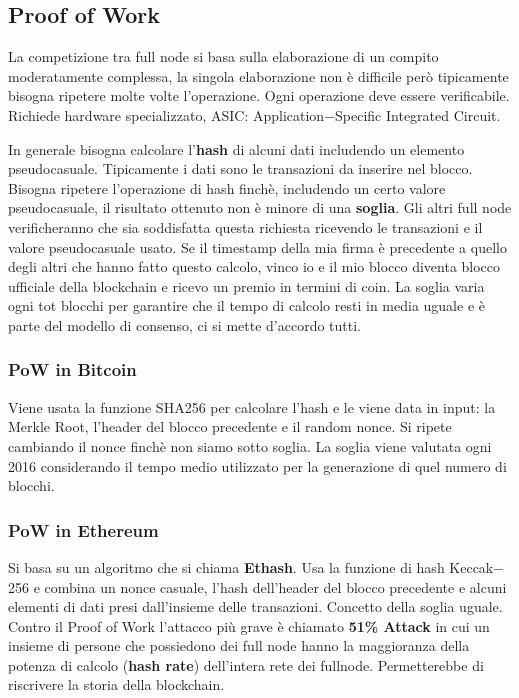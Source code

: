 \subsection{Proof of Work}
La competizione tra full node si basa sulla elaborazione di un compito moderatamente complessa, la singola elaborazione non è difficile però tipicamente bisogna ripetere molte volte l'operazione. Ogni operazione deve essere verificabile. Richiede hardware specializzato, ASIC: Application$-$Specific Integrated Circuit.

In generale bisogna calcolare l'\textbf{hash} di alcuni dati includendo un elemento pseudocasuale. Tipicamente i dati sono le transazioni da inserire nel blocco. Bisogna ripetere l'operazione di hash finchè, includendo un certo valore pseudocasuale, il risultato ottenuto non è minore di una \textbf{soglia}. Gli altri full node verificheranno che sia soddisfatta questa richiesta ricevendo le transazioni e il valore pseudocasuale usato. Se il timestamp della mia firma è precedente a quello degli altri che hanno fatto questo calcolo, vinco io e il mio blocco diventa blocco ufficiale della blockchain e ricevo un premio in termini di coin. La soglia varia ogni tot blocchi per garantire che il tempo di calcolo resti in media uguale e è parte del modello di consenso, ci si mette d'accordo tutti.  

\subsubsection{PoW in Bitcoin}
Viene usata la funzione SHA256 per calcolare l'hash e le viene data in input: la Merkle Root, l'header del blocco precedente e il random nonce. Si ripete cambiando il nonce finchè non siamo sotto soglia. La soglia viene valutata ogni 2016 considerando il tempo medio utilizzato per la generazione di quel numero di blocchi.

\subsubsection{PoW in Ethereum}
Si basa su un algoritmo che si chiama \textbf{Ethash}. Usa la funzione di hash Keccak$-$256 e combina un nonce casuale, l'hash dell'header del blocco precedente e alcuni elementi di dati presi dall'insieme delle transazioni. Concetto della soglia uguale.\\

Contro il Proof of Work l'attacco più grave è chiamato \textbf{51\% Attack} in cui un insieme di persone che possiedono dei full node hanno la maggioranza della potenza di calcolo (\textbf{hash rate}) dell'intera rete dei fullnode. Permetterebbe di riscrivere la storia della blockchain. \\

